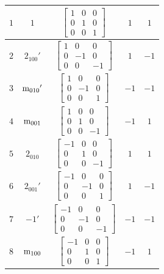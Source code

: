 \documentclass[fleqn,8pt]{jsarticle}
\begin{document}
\begin{longtable}{ccccc}
$ 1 $ & $ 1 $ & $ \begin{bmatrix} 1 & 0 & 0 \\ 0 & 1 & 0 \\ 0 & 0 & 1 \end{bmatrix} $ & $ 1 $ & $ 1 $ \\ \hline
$ 2 $ & $ 2{}_{100}{}' $ & $ \begin{bmatrix} 1 & 0 & 0 \\ 0 & -1 & 0 \\ 0 & 0 & -1 \end{bmatrix} $ & $ 1 $ & $ -1 $ \\ \hline
$ 3 $ & $ {\rm m}_{010}{}' $ & $ \begin{bmatrix} 1 & 0 & 0 \\ 0 & -1 & 0 \\ 0 & 0 & 1 \end{bmatrix} $ & $ -1 $ & $ -1 $ \\ \hline
$ 4 $ & $ {\rm m}_{001} $ & $ \begin{bmatrix} 1 & 0 & 0 \\ 0 & 1 & 0 \\ 0 & 0 & -1 \end{bmatrix} $ & $ -1 $ & $ 1 $ \\ \hline
$ 5 $ & $ 2{}_{010} $ & $ \begin{bmatrix} -1 & 0 & 0 \\ 0 & 1 & 0 \\ 0 & 0 & -1 \end{bmatrix} $ & $ 1 $ & $ 1 $ \\ \hline
$ 6 $ & $ 2{}_{001}{}' $ & $ \begin{bmatrix} -1 & 0 & 0 \\ 0 & -1 & 0 \\ 0 & 0 & 1 \end{bmatrix} $ & $ 1 $ & $ -1 $ \\ \hline
$ 7 $ & $ -1{}' $ & $ \begin{bmatrix} -1 & 0 & 0 \\ 0 & -1 & 0 \\ 0 & 0 & -1 \end{bmatrix} $ & $ -1 $ & $ -1 $ \\ \hline
$ 8 $ & $ {\rm m}_{100} $ & $ \begin{bmatrix} -1 & 0 & 0 \\ 0 & 1 & 0 \\ 0 & 0 & 1 \end{bmatrix} $ & $ -1 $ & $ 1 $ \\
\end{longtable}
\end{document}
